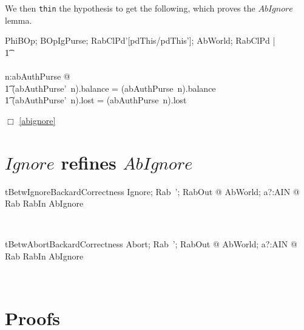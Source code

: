 We then \texttt{thin} the hypothesis to get the following, which proves
the $AbIgnore$ lemma.
\begin{gzed}
  PhiBOp; BOpIgPurse; RabClPd'[pdThis/pdThis']; AbWorld; RabClPd  |
  \\ %
  \t1 \pdThisPred \land \chosenLostPred
  \\ %
  \shows
  \\ %
  \forall n:\dom abAuthPurse @
  \\ %
  \t1 (abAuthPurse'~n).balance = (abAuthPurse~n).balance
  \\ %
  \t1 \land (abAuthPurse'~n).lost = (abAuthPurse~n).lost
\end{gzed}

$\Box$ \ref{abignore}
\section{$Ignore$ refines $AbIgnore$}
\label{ignore}

\begin{LThm}
\begin{theorem}{tBetwIgnoreBackardCorrectness}
  \forall Ignore; Rab~'; RabOut @ \exists AbWorld; a?:AIN @ Rab \land RabIn \land AbIgnore
\end{theorem}~\end{LThm}
%
\begin{LThm}
\begin{theorem}{tBetwAbortBackardCorrectness}
    \forall Abort; Rab~'; RabOut @ \exists AbWorld; a?:AIN @ Rab \land RabIn \land AbIgnore
\end{theorem}~\end{LThm}

\section*{Proofs}

\begin{LPScript}\begin{zproof}[tBetwIgnoreBackardCorrectness]

\end{zproof}\end{LPScript}

\begin{LPScript}\begin{zproof}[tBetwAbortBackardCorrectness]

\end{zproof}\end{LPScript}


